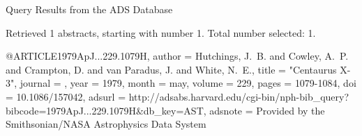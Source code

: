 Query Results from the ADS Database


Retrieved 1 abstracts, starting with number 1.  Total number selected: 1.

@ARTICLE{1979ApJ...229.1079H,
   author = {{Hutchings}, J.~B. and {Cowley}, A.~P. and {Crampton}, D. and 
	{van Paradus}, J. and {White}, N.~E.},
    title = "{Centaurus X-3}",
  journal = {\apj},
     year = 1979,
    month = may,
   volume = 229,
    pages = {1079-1084},
      doi = {10.1086/157042},
   adsurl = {http://adsabs.harvard.edu/cgi-bin/nph-bib_query?bibcode=1979ApJ...229.1079H&db_key=AST},
  adsnote = {Provided by the Smithsonian/NASA Astrophysics Data System}
}


